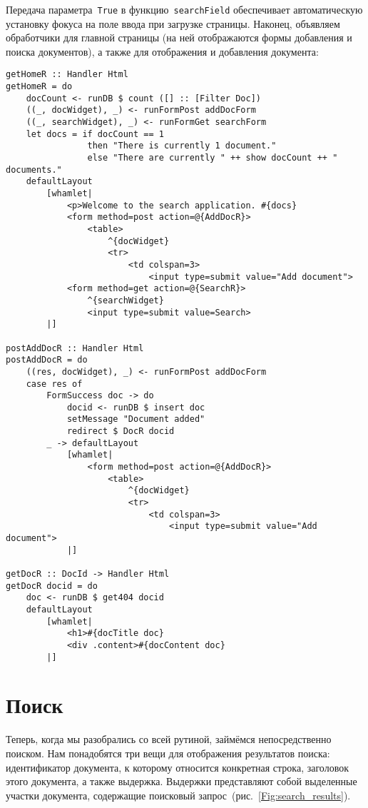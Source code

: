 Передача параметра~\lstinline'True' в функцию~\lstinline'searchField' обеспечивает автоматическую установку фокуса на поле ввода при загрузке страницы. Наконец, объявляем обработчики для главной страницы (на ней отображаются формы добавления и поиска документов), а также для отображения и добавления документа:
\begin{lstlisting}
getHomeR :: Handler Html
getHomeR = do
    docCount <- runDB $ count ([] :: [Filter Doc])
    ((_, docWidget), _) <- runFormPost addDocForm
    ((_, searchWidget), _) <- runFormGet searchForm
    let docs = if docCount == 1
                then "There is currently 1 document."
                else "There are currently " ++ show docCount ++ " documents."
    defaultLayout
        [whamlet|
            <p>Welcome to the search application. #{docs}
            <form method=post action=@{AddDocR}>
                <table>
                    ^{docWidget}
                    <tr>
                        <td colspan=3>
                            <input type=submit value="Add document">
            <form method=get action=@{SearchR}>
                ^{searchWidget}
                <input type=submit value=Search>
        |]

postAddDocR :: Handler Html
postAddDocR = do
    ((res, docWidget), _) <- runFormPost addDocForm
    case res of
        FormSuccess doc -> do
            docid <- runDB $ insert doc
            setMessage "Document added"
            redirect $ DocR docid
        _ -> defaultLayout
            [whamlet|
                <form method=post action=@{AddDocR}>
                    <table>
                        ^{docWidget}
                        <tr>
                            <td colspan=3>
                                <input type=submit value="Add document">
            |]

getDocR :: DocId -> Handler Html
getDocR docid = do
    doc <- runDB $ get404 docid
    defaultLayout
        [whamlet|
            <h1>#{docTitle doc}
            <div .content>#{docContent doc}
        |]
\end{lstlisting}%

\section{Поиск}
Теперь, когда мы разобрались со всей рутиной, займёмся непосредственно поиском. Нам понадобятся три вещи для отображения результатов поиска: идентификатор документа, к которому относится конкретная строка, заголовок этого документа, а также выдержка. Выдержки представляют собой выделенные участки документа, содержащие поисковый запрос~(рис.~\ref{Fig:search_results}).

